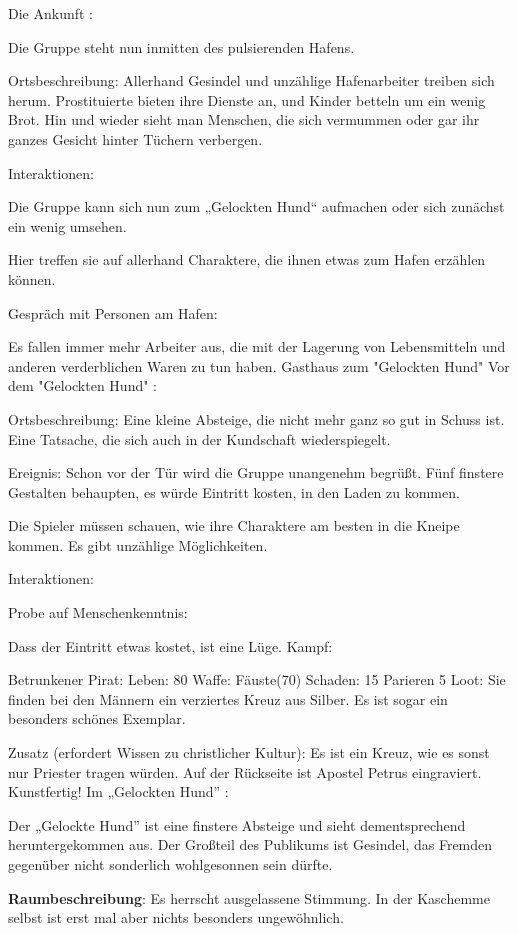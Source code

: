 Die Ankunft
:

Die Gruppe steht nun inmitten des pulsierenden Hafens.

Ortsbeschreibung: Allerhand Gesindel und unzählige Hafenarbeiter treiben sich herum. Prostituierte bieten ihre Dienste an, und Kinder betteln um ein wenig Brot. Hin und wieder sieht man Menschen, die sich vermummen oder gar ihr ganzes Gesicht hinter Tüchern verbergen.

Interaktionen:

Die Gruppe kann sich nun zum „Gelockten Hund“ aufmachen oder sich zunächst ein wenig umsehen.

Hier treffen sie auf allerhand Charaktere, die ihnen etwas zum Hafen erzählen können.

Gespräch mit Personen am Hafen:

Es fallen immer mehr Arbeiter aus, die mit der Lagerung von Lebensmitteln und anderen verderblichen Waren zu tun haben.
Gasthaus zum "Gelockten Hund"
Vor dem "Gelockten Hund"
:

Ortsbeschreibung: Eine kleine Absteige, die nicht mehr ganz so gut in Schuss ist. Eine Tatsache, die sich auch in der Kundschaft wiederspiegelt.

Ereignis: Schon vor der Tür wird die Gruppe unangenehm begrüßt. Fünf finstere Gestalten behaupten, es würde Eintritt kosten, in den Laden zu kommen.

Die Spieler müssen schauen, wie ihre Charaktere am besten in die Kneipe kommen. Es gibt unzählige Möglichkeiten.


Interaktionen:

Probe auf Menschenkenntnis:

Dass der Eintritt etwas kostet, ist eine Lüge.
Kampf:

Betrunkener Pirat:
Leben: 80
Waffe: Fäuste(70)
Schaden: 15
Parieren 5
Loot:
Sie finden bei den Männern ein verziertes Kreuz aus Silber. Es ist sogar ein besonders schönes Exemplar.

Zusatz (erfordert Wissen zu christlicher Kultur):
Es ist ein Kreuz, wie es sonst nur Priester tragen würden.
Auf der Rückseite ist Apostel Petrus eingraviert. Kunstfertig!
Im „Gelockten Hund”
:

Der „Gelockte Hund” ist eine finstere Absteige und sieht dementsprechend heruntergekommen aus. Der Großteil des Publikums ist Gesindel, das Fremden gegenüber nicht sonderlich wohlgesonnen sein dürfte.

\textbf{Raumbeschreibung}: Es herrscht ausgelassene Stimmung. In der Kaschemme selbst ist erst mal aber nichts besonders ungewöhnlich.

